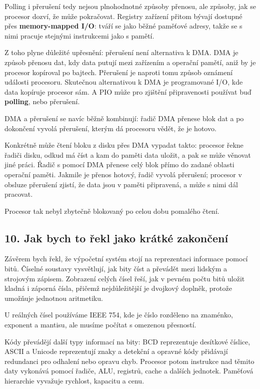 Polling i přerušení tedy nejsou plnohodnotné způsoby přenosu, ale způsoby, jak se procesor dozví, že může pokračovat. Registry zařízení přitom bývají dostupné přes \textbf{memory-mapped I/O}: tváří se jako běžné paměťové adresy, takže se s nimi pracuje stejnými instrukcemi jako s pamětí.

Z toho plyne důležité upřesnění: přerušení není alternativa k DMA. DMA je způsob přenosu dat, kdy data putují mezi zařízením a operační pamětí, aniž by je procesor kopíroval po bajtech. Přerušení je naproti tomu způsob oznámení události procesoru. Skutečnou alternativou k DMA je programované I/O, kde data kopíruje procesor sám. A PIO může pro zjištění připravenosti používat buď \textbf{polling}, nebo přerušení.

DMA a přerušení se navíc běžně kombinují: řadič DMA přenese blok dat a po dokončení vyvolá přerušení, kterým dá procesoru vědět, že je hotovo.

Konkrétně může čtení bloku z disku přes DMA vypadat takto: procesor řekne řadiči disku, odkud má číst a kam do paměti data uložit, a pak se může věnovat jiné práci. Řadič s pomocí DMA přenese celý blok přímo do zadané oblasti operační paměti. Jakmile je přenos hotový, řadič vyvolá přerušení; procesor v obsluze přerušení zjistí, že data jsou v paměti připravená, a může s nimi dál pracovat.

Procesor tak nebyl zbytečně blokovaný po celou dobu pomalého čtení.

\subsection*{10. Jak bych to řekl jako krátké zakončení}

Závěrem bych řekl, že výpočetní systém stojí na reprezentaci informace pomocí bitů. Číselné soustavy vysvětlují, jak bity číst a převádět mezi lidským a strojovým zápisem. Zobrazení celých čísel řeší, jak v pevném počtu bitů uložit kladná i záporná čísla, přičemž nejdůležitější je dvojkový doplněk, protože umožňuje jednotnou aritmetiku.

U reálných čísel používáme IEEE 754, kde je číslo rozděleno na znaménko, exponent a mantisu, ale musíme počítat s omezenou přesností.

Kódy převádějí další typy informací na bity: BCD reprezentuje desítkové číslice, ASCII a Unicode reprezentují znaky a detekční a opravné kódy přidávají redundanci pro odhalení nebo opravu chyb. Procesor potom instrukce nad těmito daty vykonává pomocí řadiče, ALU, registrů, cache a dalších jednotek. Paměťová hierarchie vyvažuje rychlost, kapacitu a cenu.

